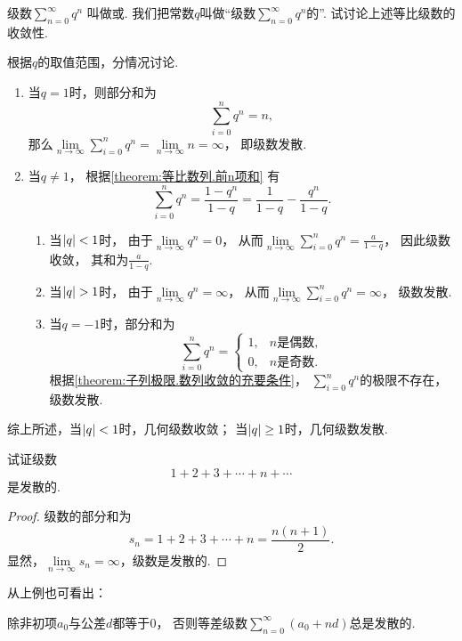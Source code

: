 \begin{example}\label{example:无穷级数.等比级数的收敛性}
级数\(\sum\limits_{n=0}^\infty q^n\)
叫做或.
我们把常数\(q\)叫做“级数\(\sum\limits_{n=0}^\infty q^n\)的”.
试讨论上述等比级数的收敛性.
\begin{solution}
根据\(q\)的取值范围，分情况讨论.
\begin{enumerate}
	\item 当\(q = 1\)时，则部分和为\[
		\sum\limits_{i=0}^n q^n
		= n,
	\]
	那么\(\lim\limits_{n\to\infty} \sum\limits_{i=0}^n q^n
	= \lim\limits_{n\to\infty} n
	= \infty\)，
	即级数发散.

	\item 当\(q \neq 1\)，
	根据\cref{theorem:等比数列.前n项和} 有\[
		\sum\limits_{i=0}^n q^n
		= \frac{1-q^n}{1-q}
		= \frac{1}{1-q} - \frac{q^n}{1-q}.
	\]
	\begin{enumerate}
		\item 当\(\abs{q} < 1\)时，
		由于\(\lim\limits_{n\to\infty} q^n=0\)，
		从而\(\lim\limits_{n\to\infty} \sum\limits_{i=0}^n q^n
		=\frac{a}{1-q}\)，
		因此级数收敛，
		其和为\(\frac{a}{1-q}\).

		\item 当\(\abs{q} > 1\)时，
		由于\(\lim\limits_{n\to\infty} q^n=\infty\)，
		从而\(\lim\limits_{n\to\infty} \sum\limits_{i=0}^n q^n
		=\infty\)，
		级数发散.

		\item 当\(q = -1\)时，部分和为\[
			\sum\limits_{i=0}^n q^n
			= \begin{cases}
				1, & \text{\(n\)是偶数}, \\
				0, & \text{\(n\)是奇数}.
			\end{cases}
		\]
		根据\cref{theorem:子列极限.数列收敛的充要条件}，
		\(\sum\limits_{i=0}^n q^n\)的极限不存在，级数发散.
	\end{enumerate}
\end{enumerate}

综上所述，{\color{red}当\(\abs{q} < 1\)时，几何级数收敛；
当\(\abs{q} \geq 1\)时，几何级数发散.}
\end{solution}
\end{example}

\begin{example}\label{example:无穷级数.等差级数的收敛性}
试证级数\[
1+2+3+\dotsb+n+\dotsb
\]是发散的.
\begin{proof}
级数的部分和为\[
s_n = 1+2+3+\dotsb+n = \frac{n(n+1)}{2}.
\]显然，\(\lim\limits_{n\to\infty} s_n=\infty\)，级数是发散的.
\end{proof}
\end{example}
从上例也可看出：
\begin{proposition}
除非初项\(a_0\)与公差\(d\)都等于\(0\)，
否则等差级数\(\sum\limits_{n=0}^\infty(a_0+nd)\)总是发散的.
\end{proposition}

